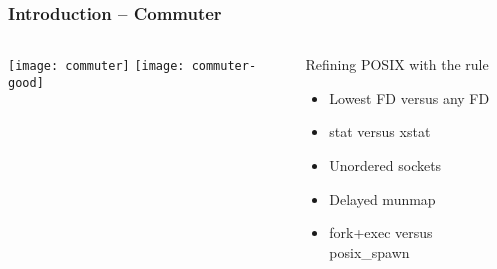 \begin{frame}[plain]
	\frametitle{Introduction -- Commuter}
	
	
	\begin{columns}
		
		\begin{column}{.3\textwidth}	
			
			\texttt{[image: commuter]}
			\texttt{[image: commuter-good]}
			
		\end{column}
		
		\begin{column}{.7\textwidth}
			
			\Large
			\begin{block}{Refining POSIX with the rule}
				\begin{itemize}
				\item Lowest FD versus any FD
				\item stat versus xstat
				\item  Unordered sockets
				\item  Delayed munmap
				\item fork+exec versus posix\_spawn
				\end{itemize}
				
			\end{block}

		\end{column}
		
	\end{columns}
	
	
\end{frame}	
